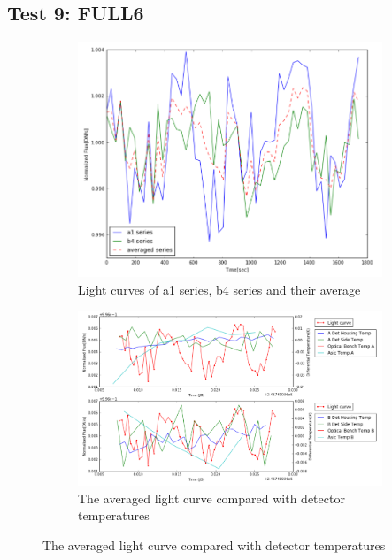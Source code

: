 \documentclass[conference]{IEEEtran}
\begin{document}
\subsection{Test 9: FULL6} 
\begin{figure}[H]
    \centering
    \begin{subfigure}{1}
        \includegraphics[scale=0.4]{ts_test9}
        \caption{Light curves of a1 series, b4 series and their average}
    \end{subfigure}

    \begin{subfigure}{2}
        \includegraphics[scale=0.4]{temp_test9}
        \caption{The averaged light curve compared with detector temperatures}
    \end{subfigure}
   

\end{figure}
\end{document}
